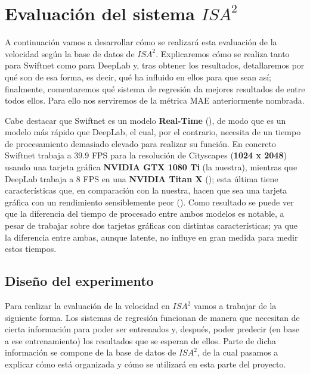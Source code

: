 \section{Evaluación del sistema $ISA^{2}$}

A continuación vamos a desarrollar cómo se realizará esta evaluación de la velocidad según la base de datos de $ISA^{2}$. Explicaremos cómo se realiza tanto para Swiftnet como para DeepLab y, tras obtener los resultados, detallaremos por qué son de esa forma, es decir, qué ha influido en ellos para que sean así; finalmente, comentaremos qué sistema de regresión da mejores resultados de entre todos ellos. Para ello nos serviremos de la métrica \ac{MAE} anteriormente nombrada.

Cabe destacar que Swiftnet es un modelo \textbf{Real-Time} (\cite{swiftnet}), de modo que es un modelo más rápido que DeepLab, el cual, por el contrario, necesita de un tiempo de procesamiento demasiado elevado para realizar su función. En concreto Swiftnet trabaja a 39.9 \ac{FPS} para la resolución de Cityscapes (\textbf{1024 x 2048}) usando una tarjeta gráfica \textbf{NVIDIA GTX 1080 Ti} (la nuestra), mientras que DeepLab trabaja a 8 \ac{FPS} en una \textbf{NVIDIA Titan X} (\cite{deeplab}); esta última tiene características que, en comparación con la nuestra, hacen que sea una tarjeta gráfica con un rendimiento sensiblemente peor (\cite{gtx_titan}). Como resultado se puede ver que la diferencia del tiempo de procesado entre ambos modelos es notable, a pesar de trabajar sobre dos tarjetas gráficas con distintas características; ya que la diferencia entre ambas, aunque latente, no influye en gran medida para medir estos tiempos. %

\subsection{Diseño del experimento}

Para realizar la evaluación de la velocidad en $ISA^{2}$ vamos a trabajar de la siguiente forma. Los sistemas de regresión funcionan de manera que necesitan de cierta información para poder ser entrenados y, después, poder predecir (en base a ese entrenamiento) los resultados que se esperan de ellos. Parte de dicha información se compone de la base de datos de $ISA^{2}$, de la cual pasamos a explicar cómo está organizada y cómo se utilizará en esta parte del proyecto.


